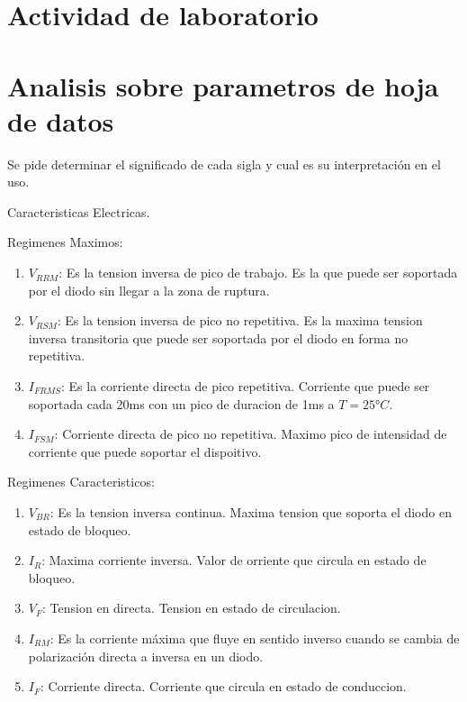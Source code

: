 \documentclass[chaptersright]{informeutn}
\begin{document}
    \chapter{Actividad de laboratorio}
    \chapter{Analisis sobre parametros de hoja de datos}

        Se pide  determinar el significado de cada sigla y cual es su interpretación en el uso.



        Caracteristicas Electricas.


        Regimenes Maximos:

        \begin{enumerate}
          \item $V_{RRM}$: Es la tension inversa de pico de trabajo. Es la que puede ser soportada por el diodo sin
              llegar a la zona de ruptura.\\
            \item $V_{RSM}$: Es la tension inversa de pico no repetitiva. Es la maxima tension inversa transitoria que
              puede ser soportada  por el diodo en forma no repetitiva.\\
            \item $I_{FRMS}$: Es la corriente directa de pico repetitiva. Corriente que puede ser soportada cada 20ms
              con un pico de duracion de 1ms a $T=25°C$.\\
            \item $I_{FSM}$: Corriente directa de pico no repetitiva. Maximo pico de intensidad de corriente que puede
              soportar el dispoitivo.
        \end{enumerate}



        Regimenes Caracteristicos:

        \begin{enumerate}
          \item $V_{BR}$: Es la tension inversa continua. Maxima tension que soporta el diodo en estado de bloqueo.\\
            \item $I_R$: Maxima corriente inversa. Valor de orriente que circula en estado de bloqueo.\\
            \item $V_F$: Tension en directa. Tension en estado de circulacion.\\
            \item $I_{RM}$: Es la corriente máxima que fluye en sentido inverso cuando se cambia de polarización
              directa a inversa en un diodo.\\
            \item $I_F$: Corriente directa. Corriente que circula en estado de conduccion.
        \end{enumerate}
\end{document}
